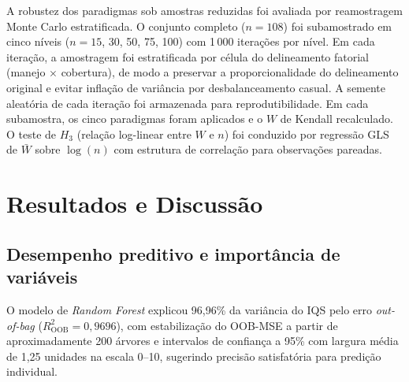 \documentclass[pdflatex,sn-basic]{sn-jnl}%
\begin{document}
A robustez dos paradigmas sob amostras reduzidas foi avaliada por reamostragem Monte Carlo estratificada. O conjunto completo ($n = 108$) foi subamostrado em cinco níveis ($n = 15$, 30, 50, 75, 100) com 1\,000 iterações por nível. Em cada iteração, a amostragem foi estratificada por célula do delineamento fatorial (manejo $\times$ cobertura), de modo a preservar a proporcionalidade do delineamento original e evitar inflação de variância por desbalanceamento casual. A semente aleatória de cada iteração foi armazenada para reprodutibilidade. Em cada subamostra, os cinco paradigmas foram aplicados e o $W$ de Kendall recalculado. O teste de $H_3$ (relação log-linear entre $W$ e $n$) foi conduzido por regressão GLS de $\bar{W}$ sobre $\log(n)$ com estrutura de correlação para observações pareadas.

\section{Resultados e Discussão}\label{sec:results_discussion}

\subsection{Desempenho preditivo e importância de variáveis}\label{subsec:performance}

O modelo de \textit{Random Forest} explicou 96,96\% da variância do IQS pelo erro \textit{out-of-bag} ($R^2_{\text{OOB}} = 0{,}9696$), com estabilização do OOB-MSE a partir de aproximadamente 200 árvores e intervalos de confiança a 95\% com largura média de 1,25 unidades na escala 0--10, sugerindo precisão satisfatória para predição individual.
\end{document}
